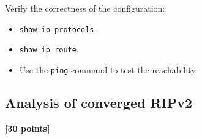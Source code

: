 \documentclass[pdftex,12pt,a4paper]{article}
\begin{document}
            Verify the correctness of the configuration:
            \begin{itemize}
                \item \texttt{show ip protocols}.
                \item \texttt{show ip route}.
                \item Use the \texttt{ping} command to test the reachability.
            \end{itemize}

        \subsection{Analysis of converged RIPv2}
            \begin{flushright}
                \textbf{[30 points]}
            \end{flushright}
\end{document}
